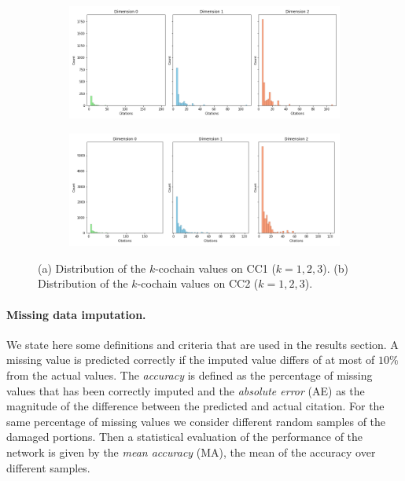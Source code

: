 \begin{figure}[tb]
\centering
 \begin{subfigure}[t]{-0.8\textwidth}
 \vspace{-4cm}
  \end{subfigure}
\begin{subfigure}[t]{0.8\textwidth}
\centering
   \includegraphics[scale=0.26]{./figures/distribution_cochain_150250.png}
\end{subfigure}
 \begin{subfigure}[t]{0.8\textwidth}
  \end{subfigure}
\begin{subfigure}[t]{0.8\textwidth}
\centering
\vspace{-0.5cm}
   \includegraphics[scale=0.26]{./figures/distribution_cochain_11779.png}
\end{subfigure}
\caption{(a) Distribution of the $k$-cochain values on CC1 ($k=1,2,3$). (b) Distribution of the $k$-cochain values on CC2 ($k=1,2,3$).}
\label{fig:dist-cochains}
\end{figure}

\paragraph{Missing data imputation.}
We state here some definitions and criteria that are used in the results section.
A missing value is predicted correctly if the imputed value differs of at most of $10\%$ from the actual values. The \emph{accuracy} is defined as the percentage of missing values that has been correctly imputed and the \emph{absolute error} (AE) as the magnitude of the difference between the predicted and actual citation.
For the same percentage of missing values we consider different random samples of the damaged portions. Then a statistical evaluation of the performance of the network is given by the \emph{mean accuracy} (MA), the mean of the accuracy over different samples.
